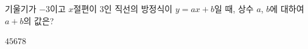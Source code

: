 기울기가 $-3$이고 $x$절편이 $3$인 직선의 방정식이 $y=ax+b$일 때, 상수 $a$, $b$에 대하여 $a+b$의 값은?
\begin{choices32}{$4$}{$5$}{$6$}{$7$}{$8$}\end{choices32}
